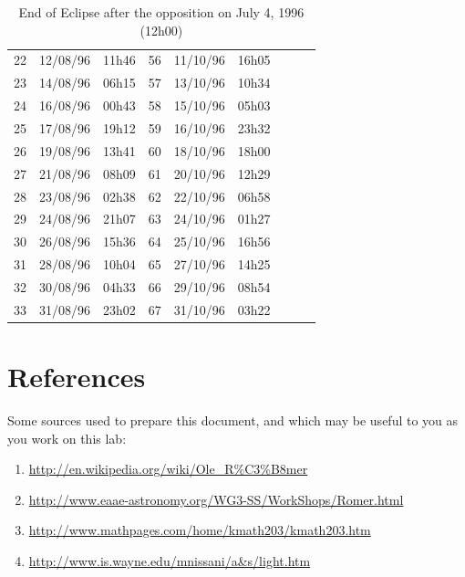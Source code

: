 \documentclass{tufte-handout}
\begin{document}
\begin{table}
\begin{tabular}{lll|lll|lll}
22 & 12/08/96 & 11h46 & 56 & 11/10/96 & 16h05 & & &\\
23 & 14/08/96 & 06h15 & 57 & 13/10/96 & 10h34 & & &\\
24 & 16/08/96 & 00h43 & 58 & 15/10/96 & 05h03 & & &\\
25 & 17/08/96 & 19h12 & 59 & 16/10/96 & 23h32 & & &\\
26 & 19/08/96 & 13h41 & 60 & 18/10/96 & 18h00 & & &\\
27 & 21/08/96 & 08h09 & 61 & 20/10/96 & 12h29 & & &\\
28 & 23/08/96 & 02h38 & 62 & 22/10/96 & 06h58 & & &\\
29 & 24/08/96 & 21h07 & 63 & 24/10/96 & 01h27 & & &\\
30 & 26/08/96 & 15h36 & 64 & 25/10/96 & 16h56 & & &\\
31 & 28/08/96 & 10h04 & 65 & 27/10/96 & 14h25 & & &\\
32 & 30/08/96 & 04h33 & 66 & 29/10/96 & 08h54 & & &\\
33 & 31/08/96 & 23h02 & 67 & 31/10/96 & 03h22 & & &\\
\end{tabular}
\caption{End of Eclipse after the opposition on July 4, 1996 (12h00)}
\end{table}

\section{References}

Some sources used to prepare this document, and which may be useful to you as you work on this lab:

\begin{enumerate}
\item \url{http://en.wikipedia.org/wiki/Ole_R%C3%B8mer}
\item \url{http://www.eaae-astronomy.org/WG3-SS/WorkShops/Romer.html}
\item \url{http://www.mathpages.com/home/kmath203/kmath203.htm}
\item \url{http://www.is.wayne.edu/mnissani/a&s/light.htm}
\end{enumerate}
\end{document}
